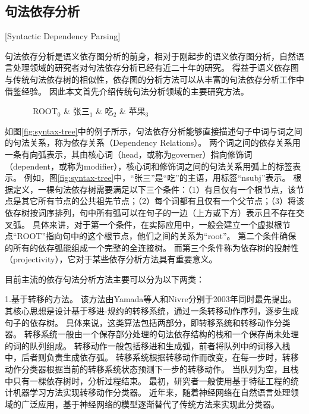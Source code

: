 \subsection{句法依存分析}[Syntactic Dependency Parsing]
\label{sec:syntactic-dependency-parsing}

句法依存分析是语义依存图分析的前身，相对于刚起步的语义依存图分析，自然语言处理领域的研究者对句法依存分析已经有近二十年的研究。
得益于语义依存图与传统句法依存树的相似性，依存图的分析方法可以从丰富的句法依存分析工作中借鉴经验。
因此本文首先介绍传统句法分析领域的主要研究方法。

\begin{figure}[htb]
	\begin{center}
			\begin{dependency}[arc edge, arc angle=80, text only label, label style={above}]
				\begin{deptext} [row sep=0.4cm, column sep=.1cm]
					\ ROOT$_0$ \& 张三$_1$ \& 吃$_2$ \& 苹果$_3$ \\
				\end{deptext}
			\end{dependency}
	\end{center}
\end{figure}

如图\ref{fig:syntax-tree}中的例子所示，句法依存分析能够直接描述句子中词与词之间的句法关系，称为依存关系（Dependency Relations）。
两个词之间的依存关系用一条有向弧表示，其由核心词（head，或称为governer）指向修饰词（dependent，或称为modifier），核心词和修饰词之间的句法关系用弧上的标签表示。
例如，图\ref{fig:syntax-tree}中，“张三”是“吃”的主语，用标签“nsubj”表示。
根据定义，一棵句法依存树需要满足以下三个条件：（1）有且仅有一个根节点，该节点是其它所有节点的公共祖先节点；（2）每个词都有且仅有一个父节点；（3）将该依存树按词序排列，句中所有弧可以在句子的一边（上方或下方）表示且不存在交叉弧。
具体来讲，对于第一个条件，在实际应用中，一般会建立一个虚拟根节点“ROOT”指向句中的这个根节点，他们之间的关系为“root”。
第二个条件确保的所有的依存弧能组成一个完整的全连接树。
而第三个条件称为依存树的投射性（projectivity），它对于某些依存分析方法具有重要意义。

目前主流的依存句法分析方法主要可以分为以下两类：

1.基于转移的方法。
该方法由Yamada等人\cite{yamada-etal-2003-statistical}和Nivre\cite{nivre-2003-efficient}分别于2003年同时最先提出。
其核心思想是设计基于移进-规约的转移系统，通过一条转移动作序列，逐步生成句子的依存树。
具体来说，这类算法包括两部分，即转移系统和转移动作分类器。
转移系统一般由一个保存部分处理的句法依存结构的栈和一个保存尚未处理的词的队列组成。
转移动作一般包括移进和生成弧，前者将队列中的词移入栈中，后者则负责生成依存弧。
转移系统根据转移动作而改变，在每一步时，转移动作分类器根据当前的转移系统状态预测下一步的转移动作。
当队列为空，且栈中只有一棵依存树时，分析过程结束。
最初，研究者一般使用基于特征工程的统计机器学习方法实现转移动作分类器。
近年来，随着神经网络在自然语言处理领域的广泛应用，基于神经网络的模型逐渐替代了传统方法来实现此分类器。


